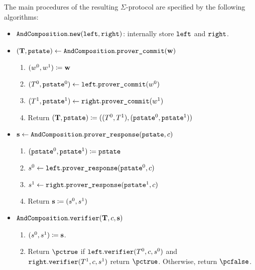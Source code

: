 \documentclass[11pt]{article}
\begin{document}

The main procedures of the resulting $\Sigma$-protocol are specified by the following algorithms:
\begin{itemize}
  \item
  $\texttt{AndComposition}.\texttt{new}(\texttt{left}, \texttt{right})$: internally store $\texttt{left}$ and $\texttt{right}$.
  \item
  $(\mathbf {T}, \texttt{pstate})\gets \texttt{AndComposition}.\texttt{prover\_commit}(\mathbf {w})$
    \begin{enumerate}
      \item
        $(w^0,w^1)\coloneqq \mathbf {w}$
      \item
        $(T^0,\texttt{pstate}^0)\gets\texttt{left}.\texttt{prover\_commit}(w^0)$
      \item $(T^1,\texttt{pstate}^1)\gets\texttt{right}.\texttt{prover\_commit}(w^1)$
      \item
	Return $(\mathbf {T},\texttt{pstate}) \coloneqq ((T^0,  T^1),(\texttt{pstate}^0,\texttt{pstate}^1))$
    \end{enumerate}
  \item
  $\mathbf {s} \gets \texttt{AndComposition}.\texttt{prover\_response}(\texttt{pstate}, c)$
  \begin{enumerate}
      \item
	    $(\texttt{pstate}^0,\texttt{pstate}^1)\coloneqq \texttt{pstate}$
      \item
      $s^0\gets\texttt{left}.\texttt{prover\_response}(\texttt{pstate}^0, c)$
      \item
      $s^1\gets\texttt{right}.\texttt{prover\_response}(\texttt{pstate}^1, c)$
      \item
      Return $\mathbf {s}\coloneqq(s^0,s^1)$
    \end{enumerate}
  \item
  $\texttt{AndComposition}.\texttt{verifier}(\mathbf {T}, c, \mathbf {s})$
  \begin{enumerate}
      \item
        $(s^0,s^1)\coloneqq \mathbf {s}$.
      \item
	Return $\accept$ if $\texttt{left}.\texttt{verifier}(T^0,c, s^0)$ and $\texttt{right}.\texttt{verifier}(T^1,c, s^1)$ return $\accept$. Otherwise, return $\reject$.

\end{enumerate}
\end{itemize}
\end{document}
